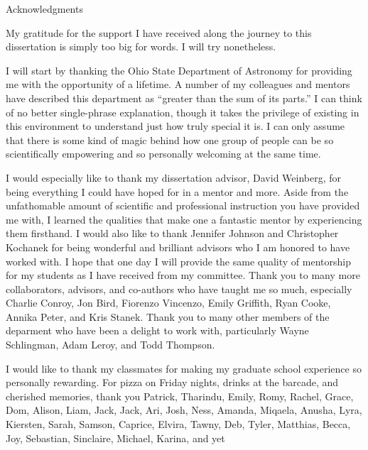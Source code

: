 \documentclass[main.tex]{subfiles}
\begin{document}
\vspace*{1cm}
\begin{center}
{\large Acknowledgments}
\end{center}

\begin{doublespace}

My gratitude for the support I have received along the journey to this
dissertation is simply too big for words.
I will try nonetheless.
\par
I will start by thanking the Ohio State Department of Astronomy for providing
me with the opportunity of a lifetime.
A number of my colleagues and mentors have described this department as
``greater than the sum of its parts.''
I can think of no better single-phrase explanation, though it takes the
privilege of existing in this environment to understand just how truly special
it is.
I can only assume that there is some kind of magic behind how one group of
people can be so scientifically empowering and so personally welcoming at the
same time.
\par
I would especially like to thank my dissertation advisor, David Weinberg, for
being everything I could have hoped for in a mentor and more.
Aside from the unfathomable amount of scientific and professional instruction
you have provided me with, I learned the qualities that make one a fantastic
mentor by experiencing them firsthand.
I would also like to thank Jennifer Johnson and Christopher Kochanek for being
wonderful and brilliant advisors who I am honored to have worked with.
I hope that one day I will provide the same quality of mentorship for my
students as I have received from my committee.
Thank you to many more collaborators, advisors, and co-authors who have taught
me so much, especially Charlie Conroy, Jon Bird, Fiorenzo Vincenzo, Emily
Griffith, Ryan Cooke, Annika Peter, and Kris Stanek.
Thank you to many other members of the deparment who have been a delight to
work with, particularly Wayne Schlingman, Adam Leroy, and Todd Thompson.
\par
I would like to thank my classmates for making my graduate school experience so
personally rewarding.
For pizza on Friday nights, drinks at the barcade, and cherished memories,
thank you Patrick, Tharindu, Emily,
Romy, Rachel, Grace, Dom, Alison, Liam, Jack, Jack, Ari, Josh, Ness, Amanda,
Miqaela, Anusha, Lyra, Kiersten, Sarah, Samson, Caprice, Elvira, Tawny, Deb,
Tyler, Matthias, Becca, Joy, Sebastian, Sinclaire, Michael, Karina, and yet

\end{doublespace}
\end{document}
